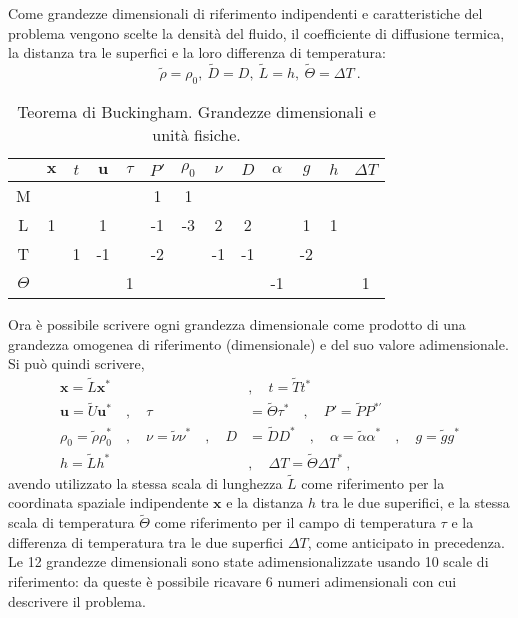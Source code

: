 \documentclass{article}
\begin{document}
\newline
Come grandezze dimensionali di riferimento indipendenti e  caratteristiche del problema vengono scelte la densità del fluido, il coefficiente di diffusione termica, la distanza tra le superfici e la loro differenza di temperatura:
\begin{equation}
    \tilde{\rho}=\rho_0, \ \tilde{D} = D, \ \tilde{L} = h, \ \tilde{\Theta} = \Delta T \ .
\end{equation}
%
\begin{table}[t]
    \centering
    \begin{tabular}{c|cc ccc ccccc cc}
    & $\bm{x}$ & $t$ & $\bm{u}$ & $\tau$ & $P'$ & $\rho_0$ & $\nu$ & $D$ & $\alpha$ & $g$ & $h$ & $\Delta T$\\ \hline
        M &   &   &   &   & 1 & 1 &   &   &   &   &   &   \\
        L & 1 &   & 1 &   &-1 &-3 & 2 & 2 &   & 1 & 1 &   \\
        T &   & 1 &-1 &   &-2 &   &-1 &-1 &   &-2 &   &   \\
 $\Theta$ &   &   &   & 1 &   &   &   &   &-1 &   &   & 1 \\
    \end{tabular}
    \caption{Teorema di Buckingham. Grandezze dimensionali e unità fisiche.}
    \label{tab:Bouss-pi-thm}
\end{table}
%
\newline
Ora è possibile scrivere ogni grandezza dimensionale come prodotto di una grandezza omogenea di riferimento (dimensionale) e del suo valore adimensionale. Si può quindi scrivere,
\begin{equation}\label{eqn:var-adim}
\begin{aligned}
    \bm{x} = \tilde{L} \bm{x}^*  \quad & , \quad t = \tilde{T} t^* \\
    \bm{u} = \tilde{U} \bm{u}^* \quad , \quad \tau & = \tilde{\Theta} \tau^* \quad , \quad P' = \tilde{P} P^{*'} \\
    \rho_0 = \tilde{\rho} \rho_0^* \quad  , \quad \nu = \tilde{\nu} \nu^* \quad , \quad D & = \tilde{D} D^* \quad , \quad \alpha = \tilde{\alpha} \alpha^* \quad , \quad g = \tilde{g} g^* \\
    h = \tilde{L} h^* \quad & , \quad \Delta T = \tilde{\Theta} \Delta T^* \ ,
\end{aligned}
\end{equation}
avendo utilizzato la stessa scala di lunghezza $\tilde{L}$ come riferimento per la coordinata spaziale indipendente $\bm{x}$ e la distanza $h$ tra le due superifici, e la stessa scala di temperatura $\tilde{\Theta}$ come riferimento per il campo di temperatura $\tau$ e la differenza di temperatura tra le due superfici $\Delta T$, come anticipato in precedenza. Le 12 grandezze dimensionali sono state adimensionalizzate usando 10 scale di riferimento: da queste è possibile ricavare 6 numeri adimensionali con cui descrivere il problema.
\end{document}
